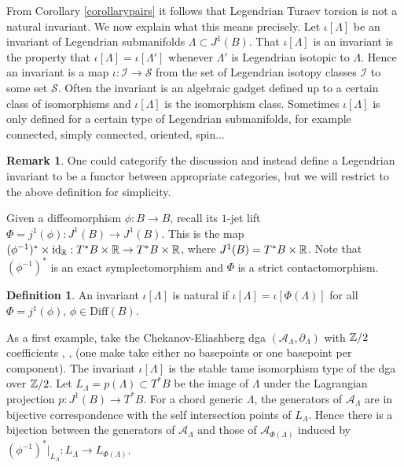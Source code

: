 \documentclass[11pt]{article}
\numberwithin{equation}{section}\providecommand{\dpl}{\displaystyle}
\let\mathcal\mathscr
\newcommand{\Diff}{\mathrm{Diff}}
\newcommand{\id}{\mathrm{id}}
\theoremstyle{plain}
\theoremstyle{definition}
\newtheorem{definition}[theorem]{Definition}
\newtheorem{remark}[theorem]{Remark}
\newcommand{\cA}{\mathcal{A}}\newcommand{\cB}{\mathcal{B}}
\newcommand{\cI}{\mathcal{I}}\newcommand{\cJ}{\mathcal{J}}
\newcommand{\cS}{\mathcal{S}}\newcommand{\cT}{\mathcal{T}}
\begin{document}
From Corollary \ref{corollarypairs} it follows that Legendrian Turaev torsion is not a natural invariant. We now explain what this means precisely. Let $\iota[\Lambda]$ be an invariant of Legendrian submanifolds $\Lambda \subset J^1(B)$. That $\iota[\Lambda]$ is an invariant is the property that $\iota[\Lambda]=\iota[\Lambda']$ whenever $\Lambda'$ is Legendrian isotopic to $\Lambda$. Hence an invariant is a map $\iota: \cI \to \cS$ from the set of Legendrian isotopy classes $\cI$ to some set $\cS$. Often the invariant is an algebraic gadget defined up to a certain class of isomorphisms and $\iota[\Lambda]$ is the isomorphism class. Sometimes $\iota[\Lambda]$ is only defined for a certain type of Legendrian submanifolds, for example connected, simply connected, oriented, spin...

\begin{remark}
One could categorify the discussion and instead define a Legendrian invariant to be a functor between appropriate categories, but we will restrict to the above definition for simplicity.
\end{remark}

Given a diffeomorphism $\phi:B \to B$, recall its $1$-jet lift $\Phi=j^1(\phi):J^1(B) \to J^1(B)$. This is the map $(\phi^{-1})^* \times \id_{\bR} : T^*B \times \bR \to T^*B \times \bR$, where $J^1(B)=T^*B \times \mathbb{R}$. Note that $(\phi^{-1})^*$ is an exact symplectomorphism and $\Phi$ is a strict contactomorphism.

\begin{definition}\label{def: naturality}
An invariant $\iota[\Lambda]$ is natural if $\iota[\Lambda]=\iota[\Phi(\Lambda)]$ for all $\Phi=j^1(\phi)$, $\phi \in \Diff(B)$.
\end{definition}

As a first example, take the Chekanov-Eliashberg dga $(\cA_{\Lambda}, \partial_{\Lambda})$ with $\mathbb{Z}/2$ coefficients \cite{C02}, \cite{E98}, \cite{EES07} (one make take either no basepoints or one basepoint per component). The invariant $\iota[\Lambda]$ is the stable tame isomorphism type of the dga over $\mathbb{Z}/2$. Let $L_{\Lambda}=p(\Lambda) \subset T^*B$ be the image of $\Lambda$ under the Lagrangian projection $p:J^1(B) \to T^*B$. For a chord generic $\Lambda$, the generators of $\cA_{\Lambda}$ are in bijective correspondence with the self intersection points of $L_{\Lambda}$. Hence there is a bijection between the generators of $\cA_{\Lambda}$ and those of $\cA_{\Phi(\Lambda)}$ induced by $(\phi^{-1})^*|_{L_\Lambda}: L_\Lambda \to L_{\Phi(\Lambda)}$.
\end{document}
